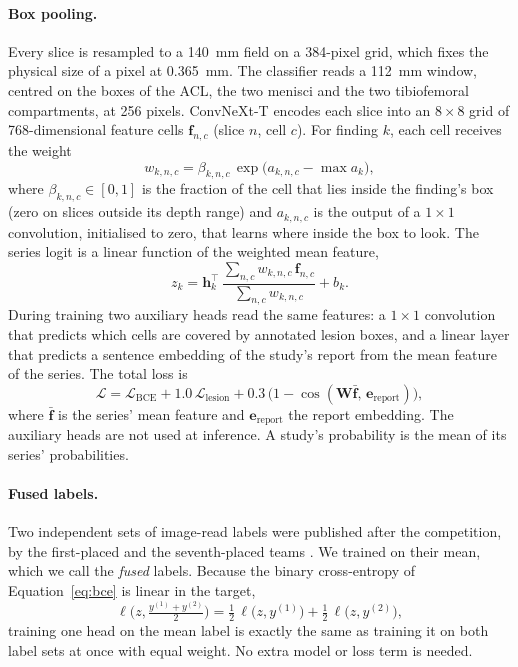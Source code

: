 \paragraph{Box pooling.} Every slice is resampled to a 140~mm field on a 384-pixel grid, which fixes the physical size of a pixel at 0.365~mm. The classifier reads a 112~mm window, centred on the boxes of the ACL, the two menisci and the two tibiofemoral compartments, at 256 pixels. ConvNeXt-T encodes each slice into an $8\times8$ grid of 768-dimensional feature cells $\mathbf f_{n,c}$ (slice $n$, cell $c$). For finding $k$, each cell receives the weight
\begin{equation}
w_{k,n,c} = \beta_{k,n,c}\,\exp\!\big(a_{k,n,c} - \max a_k\big),
\label{eq:boxweight}
\end{equation}
where $\beta_{k,n,c}\in[0,1]$ is the fraction of the cell that lies inside the finding's box (zero on slices outside its depth range) and $a_{k,n,c}$ is the output of a $1\times1$ convolution, initialised to zero, that learns where inside the box to look. The series logit is a linear function of the weighted mean feature,
\begin{equation}
z_k = \mathbf h_k^{\top}\,\frac{\sum_{n,c} w_{k,n,c}\,\mathbf f_{n,c}}{\sum_{n,c} w_{k,n,c}} + b_k .
\label{eq:boxlogit}
\end{equation}
During training two auxiliary heads read the same features: a $1\times1$ convolution that predicts which cells are covered by annotated lesion boxes, and a linear layer that predicts a sentence embedding of the study's report from the mean feature of the series. The total loss is
\begin{equation}
\mathcal L = \mathcal L_{\text{BCE}} + 1.0\,\mathcal L_{\text{lesion}} + 0.3\,\big(1-\cos(\mathbf W\bar{\mathbf f},\,\mathbf e_{\text{report}})\big),
\label{eq:bploss}
\end{equation}
where $\bar{\mathbf f}$ is the series' mean feature and $\mathbf e_{\text{report}}$ the report embedding. The auxiliary heads are not used at inference. A study's probability is the mean of its series' probabilities.

\paragraph{Fused labels.} Two independent sets of image-read labels were published after the competition, by the first-placed and the seventh-placed teams \cite{tascj_agentlabels,songqizhou_llmlabels}. We trained on their mean, which we call the \emph{fused} labels. Because the binary cross-entropy of Equation~\eqref{eq:bce} is linear in the target,
\begin{equation}
\ell\Big(z,\tfrac{y^{(1)}+y^{(2)}}{2}\Big) = \tfrac12\,\ell\big(z,y^{(1)}\big) + \tfrac12\,\ell\big(z,y^{(2)}\big),
\label{eq:fused}
\end{equation}
training one head on the mean label is exactly the same as training it on both label sets at once with equal weight. No extra model or loss term is needed.

